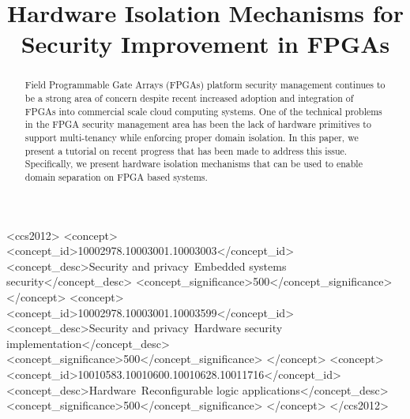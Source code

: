 \documentclass[sigconf]{acmart}
\theoremstyle{plain}
\theoremstyle{remark}
\begin{document}
\title{Hardware Isolation Mechanisms for Security Improvement in FPGAs}
%
%
%
%


\begin{abstract}
Field Programmable Gate Arrays (FPGAs) platform security management continues to be a strong area of concern despite recent increased adoption and integration of FPGAs into commercial scale cloud computing systems. One of the technical problems in the FPGA security management area has been the lack of hardware primitives to support multi-tenancy while enforcing proper domain isolation. In this paper, we present a tutorial on recent progress that has been made to address this issue. Specifically, we present hardware isolation mechanisms that can be used to enable domain separation on FPGA based systems.
\end{abstract}


\begin{CCSXML}
<ccs2012>
<concept>
<concept_id>10002978.10003001.10003003</concept_id>
<concept_desc>Security and privacy~Embedded systems security</concept_desc>
<concept_significance>500</concept_significance>
</concept>
<concept>
<concept_id>10002978.10003001.10003599</concept_id>
<concept_desc>Security and privacy~Hardware security implementation</concept_desc>
<concept_significance>500</concept_significance>
</concept>
<concept>
<concept_id>10010583.10010600.10010628.10011716</concept_id>
<concept_desc>Hardware~Reconfigurable logic applications</concept_desc>
<concept_significance>500</concept_significance>
</concept>
</ccs2012>
\end{CCSXML}

\end{document}

